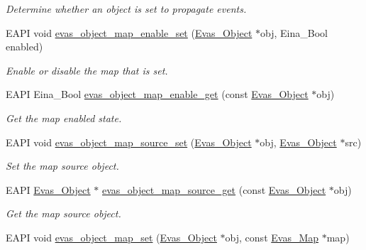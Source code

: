 \begin{DoxyCompactItemize}
\begin{DoxyCompactList}\small\item\em Determine whether an object is set to propagate events. \item\end{DoxyCompactList}\item 
EAPI void \hyperlink{Evas_8h_acee7a5f7bbb804b406405e9199d5a900}{evas\_\-object\_\-map\_\-enable\_\-set} (\hyperlink{group__Evas__Object__Group_ga9e19e6dd1f517a0ba437c0114d3e7c97}{Evas\_\-Object} $\ast$obj, Eina\_\-Bool enabled)
\begin{DoxyCompactList}\small\item\em Enable or disable the map that is set. \item\end{DoxyCompactList}\item 
EAPI Eina\_\-Bool \hyperlink{Evas_8h_a9fe49ea6c0508408d3f0c4bc6b790084}{evas\_\-object\_\-map\_\-enable\_\-get} (const \hyperlink{group__Evas__Object__Group_ga9e19e6dd1f517a0ba437c0114d3e7c97}{Evas\_\-Object} $\ast$obj)
\begin{DoxyCompactList}\small\item\em Get the map enabled state. \item\end{DoxyCompactList}\item 
EAPI void \hyperlink{Evas_8h_aa0daae782c23c5624ab0fc3e4f63c8f9}{evas\_\-object\_\-map\_\-source\_\-set} (\hyperlink{group__Evas__Object__Group_ga9e19e6dd1f517a0ba437c0114d3e7c97}{Evas\_\-Object} $\ast$obj, \hyperlink{group__Evas__Object__Group_ga9e19e6dd1f517a0ba437c0114d3e7c97}{Evas\_\-Object} $\ast$src)
\begin{DoxyCompactList}\small\item\em Set the map source object. \item\end{DoxyCompactList}\item 
EAPI \hyperlink{group__Evas__Object__Group_ga9e19e6dd1f517a0ba437c0114d3e7c97}{Evas\_\-Object} $\ast$ \hyperlink{Evas_8h_abb0578635393c514b1c228ebb7b2eed0}{evas\_\-object\_\-map\_\-source\_\-get} (const \hyperlink{group__Evas__Object__Group_ga9e19e6dd1f517a0ba437c0114d3e7c97}{Evas\_\-Object} $\ast$obj)
\begin{DoxyCompactList}\small\item\em Get the map source object. \item\end{DoxyCompactList}\item 
EAPI void \hyperlink{Evas_8h_a4c06097f01adc414be05470a3528adca}{evas\_\-object\_\-map\_\-set} (\hyperlink{group__Evas__Object__Group_ga9e19e6dd1f517a0ba437c0114d3e7c97}{Evas\_\-Object} $\ast$obj, const \hyperlink{group__Evas__Object__Group__Map_gae94fcea124ae4135e8bb15a014b334dc}{Evas\_\-Map} $\ast$map)

\end{DoxyCompactItemize}
